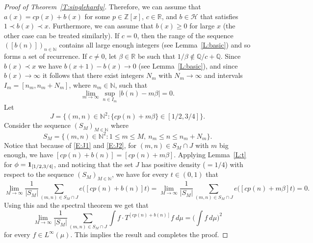 \documentclass[11pt]{amsart}
\renewcommand{\H}{\mathcal{H}}
\newcommand{\R}{\mathbb{R}}
\newcommand{\N}{\mathbb{N}}
\newcommand{\Z}{\mathbb{Z}}
\theoremstyle{plain}
\theoremstyle{definition}
\theoremstyle{remark}
\begin{document}
\begin{proof}[Proof of Theorem~\ref{T:singlehardy}]
  Therefore,  we can assume that $a(x)= c p(x)+b(x)$ for some $p\in
  \Z[x]$, $c \in\R$, and $b\in \H$ that satisfies $1\prec
  b(x)\prec x$. Furthermore, we can assume that $b(x)\geq 0$ for
  large $x$ (the other case can be treated similarly).  If $c=0$, then
  the range of the sequence $([b(n)])_{n\in\N}$ contains all large
  enough integers (see Lemma~\ref{L:basic}) and so forms a set of recurrence.  If $c\neq 0$, let
  $\beta\in \R$ be such that $1/\beta \notin \mathbb{Q}/ c+\mathbb{Q}$.  Since $b(x)\prec x$ we have $b(x+1)-b(x)\to 0$ (see
  Lemma~\ref{L:basic}), and since $b(x)\to \infty$ it follows
  that there exist integers $N_m$ with $N_m\to\infty$ and intervals
  $I_m=[n_m,n_m+N_m]$, where $n_m\in\N$, such that
  \begin{equation}\label{E:J1}
    \lim_{m\to\infty}\sup_{n\in I_m}|b(n)-m\beta|= 0.
  \end{equation}
  Let
  \begin{equation}\label{E:J2}
    J=\{(m,n)\in\N^2\colon \{c p(n)+m\beta\}\in [1/2,3/4]\}.
  \end{equation}
  Consider the sequence $(S_M)_{M\in\N}$ where
$$
S_M=\{(m,n)\in \N^2\colon 1\leq m\leq M,\ n_m\leq n\leq n_m+N_m \}.
$$
Notice that because of \eqref{E:J1} and \eqref{E:J2}, for $(m,n)\in
S_M\cap J$ with $m$ big enough, we have $[c p(n)+b(n)]=[c
p(n)+m\beta]$.  Applying Lemma~\ref{L:t} for $\phi={\bf
  1}_{[1/2,3/4]}$, and noticing that the set $J$ has positive density
($=1/4$) with respect to the sequence $(S_M)_{M\in\N}$, we have for
every $t\in (0,1)$ that
$$
\lim_{M\to\infty}\frac{1}{|S_M|}\sum_{(m,n)\in S_M\cap J}
e\big([c
p(n)+b(n)]t\big)=\lim_{M\to\infty}\frac{1}{|S_M|}\sum_{(m,n)\in
  S_M\cap J} e\big([c p(n)+m\beta]t\big)=0.
$$
Using this and the spectral theorem we get that
$$
\lim_{M\to\infty}\frac{1}{|S_M|}\sum_{(m,n)\in S_M\cap J} \int f \cdot
T^{[c p(n)+b(n)]}f \ d\mu= \Big(\int f \ d\mu\Big)^2
$$
for every $f\in L^{\infty}(\mu)$. This implies the result and
completes the proof.
\end{proof}
\end{document}
